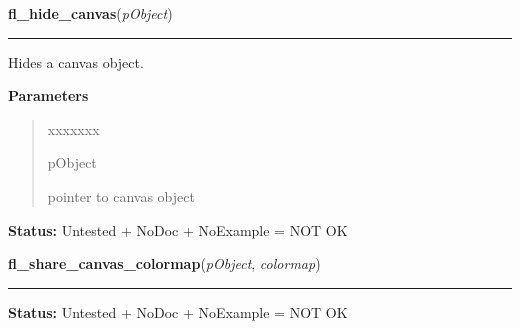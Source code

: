 \hspace{.8\funcindent}\begin{boxedminipage}{\funcwidth}

    \raggedright \textbf{fl\_hide\_canvas}(\textit{pObject})

    \vspace{-1.5ex}

    \rule{\textwidth}{0.5\fboxrule}
\setlength{\parskip}{2ex}
    Hides a canvas object.

\setlength{\parskip}{1ex}
      \textbf{Parameters}
      \vspace{-1ex}

      \begin{quote}
        \begin{Ventry}{xxxxxxx}

          \item[pObject]

          pointer to canvas object

        \end{Ventry}

      \end{quote}

\textbf{Status:} Untested + NoDoc + NoExample = NOT OK



    \end{boxedminipage}

    \label{xformslib:library:fl_share_canvas_colormap}

    \vspace{0.5ex}

\hspace{.8\funcindent}\begin{boxedminipage}{\funcwidth}

    \raggedright \textbf{fl\_share\_canvas\_colormap}(\textit{pObject}, \textit{colormap})

    \vspace{-1.5ex}

    \rule{\textwidth}{0.5\fboxrule}
\setlength{\parskip}{2ex}
\setlength{\parskip}{1ex}
\textbf{Status:} Untested + NoDoc + NoExample = NOT OK



    \end{boxedminipage}

    \label{xformslib:library:fl_clear_canvas}

